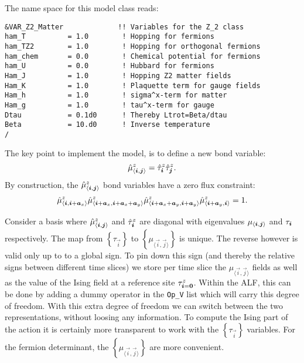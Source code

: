 The name space for this model class reads: 

\begin{lstlisting}[style=fortran,escapechar=\#,breaklines=true]
&VAR_Z2_Matter             !! Variables for the Z_2 class
ham_T          = 1.0        ! Hopping for fermions
ham_TZ2        = 1.0        ! Hopping for orthogonal fermions
ham_chem       = 0.0        ! Chemical potential for fermions
ham_U          = 0.0        ! Hubbard for fermions
Ham_J          = 1.0        ! Hopping Z2 matter fields
Ham_K          = 1.0        ! Plaquette term for gauge fields
Ham_h          = 1.0        ! sigma^x-term for matter
Ham_g          = 1.0        ! tau^x-term for gauge
Dtau           = 0.1d0      ! Thereby Ltrot=Beta/dtau
Beta           = 10.d0      ! Inverse temperature
/
\end{lstlisting}

The key point to implement the model,  is to  define a new bond variable: 
\begin{equation}
	\hat{\mu}^{z}_{ \langle  \boldsymbol{i}, \boldsymbol{j}  \rangle }  =  \hat{\tau}^{z}_{ \boldsymbol{i}}\hat{\tau}^{z}_{\boldsymbol{j}  }. 
\end{equation}  
By construction, the $\hat{\mu}^{z}_{ \langle  \boldsymbol{i}, \boldsymbol{j}  \rangle } $ bond variables   have a zero flux constraint:
\begin{equation}
	\hat{\mu}^{z}_{ \langle  \boldsymbol{i}, \boldsymbol{i} + \boldsymbol{a}_x  \rangle }  \hat{ \mu}^{z}_{ \langle  \boldsymbol{i} + \boldsymbol{a}_x, \boldsymbol{i} + \boldsymbol{a}_x  + \boldsymbol{a}_y \rangle } 
	\hat{\mu}^{z}_{ \langle  \boldsymbol{i} + \boldsymbol{a}_x + \boldsymbol{a}_y, \boldsymbol{i} +  \boldsymbol{a}_y \rangle } \hat{\mu}^{z}_{ \langle  \boldsymbol{i} + \boldsymbol{a}_y, \boldsymbol{i}  \rangle }  = 1. 
\label{zero_flux.eq}
\end{equation} 


Consider a basis where  $\hat{\mu}^{z}_{ \langle  \boldsymbol{i}, \boldsymbol{j}  \rangle } $ and $  \hat{\tau}^{z}_{ \boldsymbol{i}}$  are diagonal with eigenvalues  $\mu_{ \langle  \boldsymbol{i}, \boldsymbol{j}  \rangle } $ and $  {\tau}_{ \boldsymbol{i}}$  respectively. 
The map from  $ \left\{ \tau_{\vec{i}}  \right\} $ to $ \left\{ \mu_{\langle \vec{i}, \vec{j} \rangle } \right\} $  is unique.  The reverse however  is valid only up to  to a global sign.  To pin down this sign  (and thereby   the  relative signs between different time slices)  we  store per time slice the $  \mu_{\langle \vec{i},\vec{j} \rangle } $ fields as well as the value of the Ising field  at  a reference site $\tau^{z}_{\boldsymbol{i} = \boldsymbol{0}} $. Within the ALF, this can be done by adding a dummy operator in the \texttt{Op\_V}  list which will carry this degree of freedom.    With this extra degree of freedom we can switch  between the two representations, without loosing any information.   To compute the Ising part of the action it is certainly more transparent to work  with the $ \left\{ \tau_{\vec{i}}  \right\} $  variables. For the  fermion determinant,  the $ \left\{ \mu_{\langle \vec{i}, \vec{j} \rangle } \right\} $   are more convenient.

